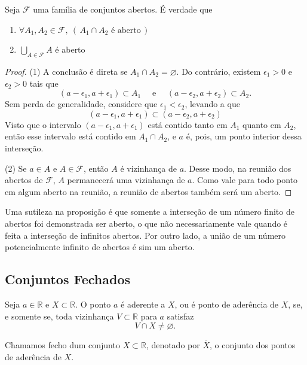 \begin{prop:aberto}
Seja $\mathcal{F}$ uma família de conjuntos abertos. É
verdade que
\begin{enumerate}
	\item $\forall A_1, A_2 \in \mathcal{F},\ (\, A_1 \cap A_2 \text{ é aberto}\,)$
	\item $\bigcup_{A \in \mathcal{F}} A$ é aberto
\end{enumerate}
\begin{proof}
	(1) A conclusão é direta se $A_1 \cap A_2 = \varnothing$. Do contrário, existem
	$\epsilon_1 > 0$ e $\epsilon_2 > 0$ tais que
	\[
		(a - \epsilon_1, a + \epsilon_1) \subset A_1 \quad \text{ e } \quad
		(a - \epsilon_2, a + \epsilon_2) \subset A_2.
	\]
	Sem perda de generalidade, considere que $\epsilon_1 < \epsilon_2$, levando a que
	\[
		(a - \epsilon_1, a + \epsilon_1) \subset (a - \epsilon_2, a + \epsilon_2)
	\]
	Visto que o intervalo $(a - \epsilon_1, a + \epsilon_1)$ está contido tanto em $A_1$
	quanto em $A_2$, então esse intervalo está contido em $A_1 \cap A_2$, e $a$ é, pois,
	um ponto interior dessa interseção.

	(2) Se $a \in A$ e $A \in \mathcal{F}$, então $A$ é vizinhança de $a$. Desse modo,
	na reunião dos abertos de $\mathcal{F}$, $A$ permanecerá uma vizinhança de $a$. Como
	vale para todo ponto em algum aberto na reunião, a reunião de abertos também será um
	aberto.
\end{proof}
\end{prop:aberto}

Uma sutileza na proposição é que somente a interseção de um número finito de abertos foi
demonstrada ser aberto, o que não necessariamente vale quando é feita a interseção de
infinitos abertos. Por outro lado, a união de um número potencialmente infinito de abertos
é sim um aberto.

\subsection{Conjuntos Fechados}

\begin{def:ponto de aderencia}
Seja $a \in \mathbb{R}$ e $X \subset \mathbb{R}$. O ponto $a$ é aderente a $X$,
ou é ponto de aderência de $X$, se, e somente se, toda vizinhança $V \subset \mathbb{R}$
para $a$ satisfaz
\[
	V \cap X \neq \varnothing.
\]
\end{def:ponto de aderencia}

\begin{def:fecho}
Chamamos fecho dum conjunto $X \subset \mathbb{R}$, denotado por $\overline{X}$,
o conjunto dos pontos de aderência de $X$.
\end{def:fecho}

